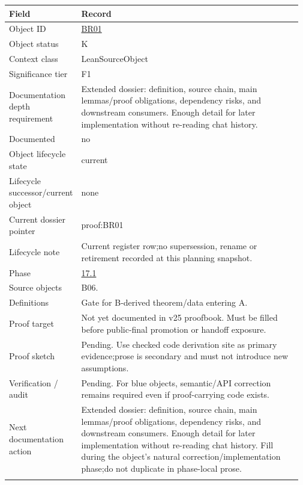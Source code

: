 \begin{longtable}{L{0.16\linewidth} L{0.81\linewidth}}
\hline
\textbf{Field} & \textbf{Record}\\
\hline
Object ID & \hyperlink{object-row-BR01}{BR01}\\
\hline\addlinespace[0.20em]
Object status & K\\
\hline\addlinespace[0.20em]
Context class & LeanSourceObject\\
\hline\addlinespace[0.20em]
Significance tier & F1\\
\hline\addlinespace[0.20em]
Documentation depth requirement & Extended dossier: definition, source chain, main lemmas/\allowbreak{}proof obligations, dependency risks, and downstream consumers. Enough detail for later implementation without re-reading chat history.\\
\hline\addlinespace[0.20em]
Documented & no\\
\hline\addlinespace[0.20em]
Object lifecycle state & current\\
\hline\addlinespace[0.20em]
Lifecycle successor/\allowbreak{}current object & none\\
\hline\addlinespace[0.20em]
Current dossier pointer & proof:BR01\\
\hline\addlinespace[0.20em]
Lifecycle note & Current register row;\newline no supersession, rename or retirement recorded at this planning snapshot.\\
\hline\addlinespace[0.20em]
Phase & \hyperlink{phase-row-17-1}{17.1}\\
\hline\addlinespace[0.20em]
Source objects & B06.\\
\hline\addlinespace[0.20em]
Definitions & Gate for B-derived theorem/\allowbreak{}data entering A.\\
\hline\addlinespace[0.20em]
Proof target & Not yet documented in v25 proofbook. Must be filled before public-final promotion or handoff exposure.\\
\hline\addlinespace[0.20em]
Proof sketch & Pending. Use checked code derivation site as primary evidence;\newline prose is secondary and must not introduce new assumptions.\\
\hline\addlinespace[0.20em]
Verification /\allowbreak{} audit & Pending. For blue objects, semantic/\allowbreak{}API correction remains required even if proof-carrying code exists.\\
\hline\addlinespace[0.20em]
Next documentation action & Extended dossier: definition, source chain, main lemmas/\allowbreak{}proof obligations, dependency risks, and downstream consumers. Enough detail for later implementation without re-reading chat history. Fill during the object's natural correction/\allowbreak{}implementation phase;\newline do not duplicate in phase-local prose.\\
\hline\addlinespace[0.20em]
\end{longtable}
